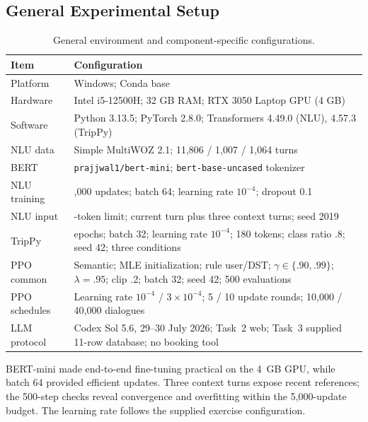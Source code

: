 \documentclass[11pt]{article}
\begin{document}
\subsection{General Experimental Setup}
\begin{table}[H]
  \centering
  \scriptsize
  \begin{tabular}{@{}
    >{\raggedright\arraybackslash}p{}
    >{\raggedright\arraybackslash}p{}@{}}
    \toprule
    \textbf{Item} & \textbf{Configuration} \\
    \midrule
    Platform & Windows; Conda base \\
    Hardware & Intel i5-12500H; 32 GB RAM; RTX 3050 Laptop GPU (4 GB) \\
    Software & Python 3.13.5; PyTorch 2.8.0; Transformers 4.49.0 (NLU), 4.57.3 (TripPy) \\
    NLU data & Simple MultiWOZ 2.1; 11,806 / 1,007 / 1,064 turns \\
    BERT & \texttt{prajjwal1/bert-mini}; \texttt{bert-base-uncased} tokenizer \\
    NLU training & 5,000 updates; batch 64; learning rate $10^{-4}$; dropout 0.1 \\
    NLU input & 40-token limit; current turn plus three context turns; seed 2019 \\
    TripPy & 10 epochs; batch 32; learning rate $10^{-4}$; 180 tokens; class ratio .8; seed 42; three conditions \\
    PPO common & Semantic; MLE initialization; rule user/DST; $\gamma\in\{.90,.99\}$; $\lambda=.95$; clip .2; batch 32; seed 42; 500 evaluations \\
    PPO schedules & Learning rate $10^{-4}$ / $3\times10^{-4}$; 5 / 10 update rounds; 10,000 / 40,000 dialogues \\
    LLM protocol & Codex Sol 5.6, 29--30 July 2026; Task~2 web; Task~3 supplied 11-row database; no booking tool \\
    \bottomrule
  \end{tabular}
  \caption{General environment and component-specific configurations.}
  \label{tab:general-setup}
\end{table}

BERT-mini made end-to-end fine-tuning practical on the 4~GB GPU, while batch 64
provided efficient updates. Three context turns expose recent references; the
500-step checks reveal convergence and overfitting within the 5,000-update
budget. The learning rate follows the supplied exercise configuration.
\end{document}
